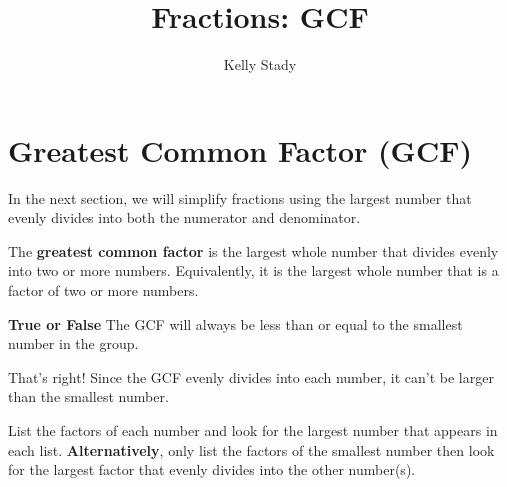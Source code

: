 \documentclass{ximera}[font=12pt]  %
\title{Fractions: GCF}   %
\author{Kelly Stady}
\begin{document}
\begin{abstract}

\end{abstract}

\maketitle

\label{xim:FracsGCFSimplify}


\section*{Greatest Common Factor (GCF)}

In the next section, we will simplify fractions using the largest number that evenly divides into both the numerator and denominator. 

\begin{definition}
The \textbf{greatest common factor} is the largest whole number that divides evenly into two or more numbers.  Equivalently, it is
the largest whole number that is a factor of two or more numbers.

\end{definition}


\begin{problem} \textcolor{orange!80!black}{\textbf{True or False}}  The GCF will always be less than or equal to the smallest 
    number in the group.

\begin{multipleChoice}
\end{multipleChoice}

\begin{feedback}[correct]
That's right!  Since the GCF evenly divides into each number, it can't be larger than the smallest number.
\end{feedback}

\end{problem}


\begin{procedure}

List the factors of each number and look for the largest number that appears in each list.  \textbf{Alternatively}, 
only list the factors of the smallest number then look for the largest factor that evenly divides into the other number(s).

\end{procedure}
\end{document}
